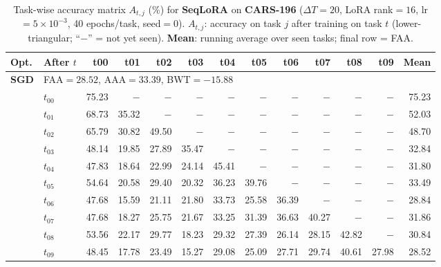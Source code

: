 
\begin{table}[ht]
\centering
\caption{%
  Task-wise accuracy matrix $A_{t,j}$ (\%) for \textbf{SeqLoRA} on \textbf{CARS-196} ($\Delta T=20$, LoRA rank$=16$, lr$=5\times10^{-3}$, 40 epochs/task, seed$=0$).
  $A_{t,j}$: accuracy on task $j$ after training on task $t$  (lower-triangular; ``$-$'' = not yet seen).
  \textbf{Mean}: running average over seen tasks; final row = FAA.
}
\label{tab:raw_seqlora_cars196}
\setlength{\tabcolsep}{2.8pt}
\renewcommand{\arraystretch}{0.88}
\scriptsize
\begin{tabular}{@{}l l r r r r r r r r r r r@{}}
\toprule
\textbf{Opt.} & \textbf{After $t$} & \textbf{t00} & \textbf{t01} & \textbf{t02} & \textbf{t03} & \textbf{t04} & \textbf{t05} & \textbf{t06} & \textbf{t07} & \textbf{t08} & \textbf{t09} & \textbf{Mean} \\
\midrule
\multirow{11}{*}{\textbf{SGD}} & \multicolumn{12}{l}{\quad\small FAA$=28.52$,\; AAA$=33.39$,\; BWT$=-15.88$} \\
 & $t_{00}$ & 75.23 & $-$ & $-$ & $-$ & $-$ & $-$ & $-$ & $-$ & $-$ & $-$ & 75.23 \\
 & $t_{01}$ & 68.73 & 35.32 & $-$ & $-$ & $-$ & $-$ & $-$ & $-$ & $-$ & $-$ & 52.03 \\
 & $t_{02}$ & 65.79 & 30.82 & 49.50 & $-$ & $-$ & $-$ & $-$ & $-$ & $-$ & $-$ & 48.70 \\
 & $t_{03}$ & 48.14 & 19.85 & 27.89 & 35.47 & $-$ & $-$ & $-$ & $-$ & $-$ & $-$ & 32.84 \\
 & $t_{04}$ & 47.83 & 18.64 & 22.99 & 24.14 & 45.41 & $-$ & $-$ & $-$ & $-$ & $-$ & 31.80 \\
 & $t_{05}$ & 54.64 & 20.58 & 29.40 & 20.32 & 36.23 & 39.76 & $-$ & $-$ & $-$ & $-$ & 33.49 \\
 & $t_{06}$ & 47.68 & 15.59 & 21.11 & 21.80 & 33.73 & 25.58 & 36.39 & $-$ & $-$ & $-$ & 28.84 \\
 & $t_{07}$ & 47.68 & 18.27 & 25.75 & 21.67 & 33.25 & 31.39 & 36.63 & 40.27 & $-$ & $-$ & 31.86 \\
 & $t_{08}$ & 53.56 & 22.17 & 29.77 & 18.23 & 29.32 & 27.39 & 26.14 & 28.15 & 42.82 & $-$ & 30.84 \\
 & $t_{09}$ & 48.45 & 17.78 & 23.49 & 15.27 & 29.08 & 25.09 & 27.71 & 29.74 & 40.61 & 27.98 & 28.52 \\
\midrule

\end{tabular}
\end{table}
